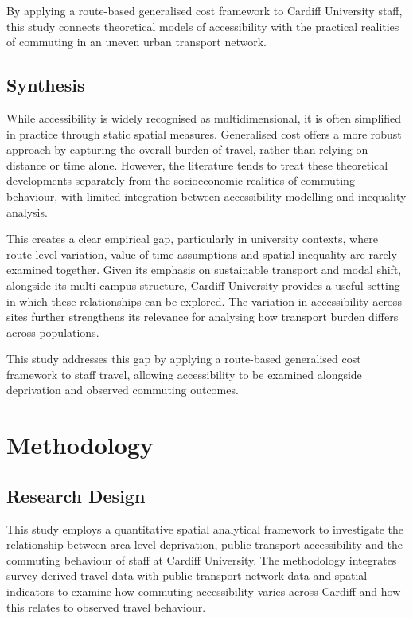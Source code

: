 \documentclass[11pt,a4paper]{article}
\begin{document}
By applying a route-based generalised cost framework to Cardiff University staff, this study connects theoretical models of accessibility with the practical realities of commuting in an uneven urban transport network.

\subsection{Synthesis}

While accessibility is widely recognised as multidimensional, it is often simplified in practice through static spatial measures. Generalised cost offers a more robust approach by capturing the overall burden of travel, rather than relying on distance or time alone. However, the literature tends to treat these theoretical developments separately from the socioeconomic realities of commuting behaviour, with limited integration between accessibility modelling and inequality analysis.

This creates a clear empirical gap, particularly in university contexts, where route-level variation, value-of-time assumptions and spatial inequality are rarely examined together. Given its emphasis on sustainable transport and modal shift, alongside its multi-campus structure, Cardiff University provides a useful setting in which these relationships can be explored. The variation in accessibility across sites further strengthens its relevance for analysing how transport burden differs across populations.

This study addresses this gap by applying a route-based generalised cost framework to staff travel, allowing accessibility to be examined alongside deprivation and observed commuting outcomes.

\section{Methodology}
\subsection{Research Design}

This study employs a quantitative spatial analytical framework to investigate the relationship between area-level deprivation, public transport accessibility and the commuting behaviour of staff at Cardiff University. The methodology integrates survey-derived travel data with public transport network data and spatial indicators to examine how commuting accessibility varies across Cardiff and how this relates to observed travel behaviour.
\end{document}
